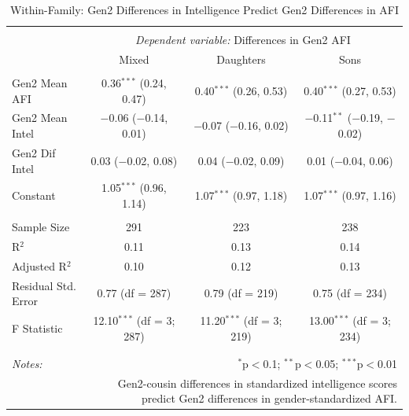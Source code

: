 \documentclass[a4paper,man,apacite,natbib,12pt,longtable]{apa6}\usepackage[]{graphicx}\usepackage[]{color}
\begin{document}
\begin{landscape}
\begin{longtable}{@{\extracolsep{5pt}}lccc} 
\caption{Within-Family: Gen2 Differences in Intelligence Predict Gen2 Differences in AFI}\label{table_Dif_Child_Intelligence_Dif_Child_AFI_9}
\\[-1.8ex]\hline 
\hline \\[-3.8ex] 
& \multicolumn{3}{c}{\textit{Dependent variable:} Differences in Gen2 AFI} \\ 
\cline{2-4}
 & Mixed & Daughters & Sons \\ 
\hline \\[-1.8ex] 
 Gen2 Mean AFI & 0.36$^{***}$ (0.24, 0.47) & 0.40$^{***}$ (0.26, 0.53) & 0.40$^{***}$ (0.27, 0.53) \\ 
  Gen2 Mean Intel & $-$0.06 ($-$0.14, 0.01) & $-$0.07 ($-$0.16, 0.02) & $-$0.11$^{**}$ ($-$0.19, $-$0.02) \\ 
  Gen2 Dif Intel & 0.03 ($-$0.02, 0.08) & 0.04 ($-$0.02, 0.09) & 0.01 ($-$0.04, 0.06) \\ 
  Constant & 1.05$^{***}$ (0.96, 1.14) & 1.07$^{***}$ (0.97, 1.18) & 1.07$^{***}$ (0.97, 1.16) \\ 
 \hline \\[-1.8ex] 
Sample Size & 291 & 223 & 238 \\ 
R$^{2}$ & 0.11 & 0.13 & 0.14 \\ 
Adjusted R$^{2}$ & 0.10 & 0.12 & 0.13 \\ 
Residual Std. Error & 0.77 (df = 287) & 0.79 (df = 219) & 0.75 (df = 234) \\ 
F Statistic & 12.10$^{***}$ (df = 3; 287) & 11.20$^{***}$ (df = 3; 219) & 13.00$^{***}$ (df = 3; 234) \\ 
\hline 
\hline \\[-1.8ex] \\[-6ex]
\textit{Notes:}  & \multicolumn{3}{r}{$^{*}$p$<$0.1; $^{**}$p$<$0.05; $^{***}$p$<$0.01} \\[2ex]
& \multicolumn{3}{r}{\parbox{.6\linewidth}{\footnotesize Gen2-cousin differences in standardized intelligence scores predict Gen2 differences in gender-standardized AFI.}} \\ 
\end{longtable}\end{landscape}
\pagebreak
\end{document}
